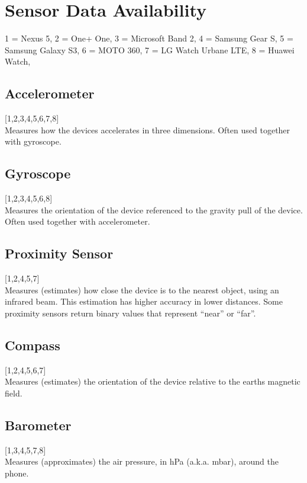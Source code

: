 
\section{Sensor Data Availability}
\label{sec:sensor_data_availability}
1 = Nexus 5,
2 = One+ One,
3 = Microsoft Band 2,
4 = Samsung Gear S,
5 = Samsung Galaxy S3,
6 = MOTO 360,
7 = LG Watch Urbane LTE,
8 = Huawei Watch,




\subsection{Accelerometer}
\label{sub:accelerometer}
[1,2,3,4,5,6,7,8] \\
Measures how the devices accelerates in three dimensions. Often used together with gyroscope.

\subsection{Gyroscope}
\label{sub:gyroscope}
[1,2,3,4,5,6,8] \\
Measures the orientation of the device referenced to the gravity pull of the device. Often used together with accelerometer.

\subsection{Proximity Sensor}
\label{sub:proximity_sensor}
[1,2,4,5,7] \\
Measures (estimates) how close the device is to the nearest object, using an infrared beam. This estimation has higher accuracy in lower distances. Some proximity sensors return binary values that represent ``near'' or ``far''.

\subsection{Compass}
\label{sub:compass}
[1,2,4,5,6,7] \\
Measures (estimates) the orientation of the device relative to the earths magnetic field.

\subsection{Barometer}
\label{sub:barometer}
[1,3,4,5,7,8] \\
Measures (approximates) the air pressure, in hPa (a.k.a. mbar), around the phone.

